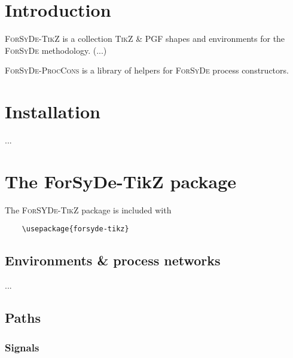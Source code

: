 \documentclass[10pt]{article}
\begin{document}
\maketitle

\begin{abstract}
This document is the reference manual for the \textsc{ForSyDe-TikZ} and \textsc{ForSyDe-ProcCons} packages. A new feature in the library should be reflected and documented in this manual.
\end{abstract}

\section{Introduction}

\textsc{ForSyDe-TikZ} is a collection \textsc{TikZ} \& \textsc{PGF} shapes and environments for the \textsc{ForSyDe} methodology. (...)

\textsc{ForSyDe-ProcCons} is a library of helpers for \textsc{ForSyDe} process constructors.

\section{Installation}

...


\section{The ForSyDe-TikZ package}

The \textsc{ForSYDe-TikZ} package is included with

\begin{verbatim}
	\usepackage{forsyde-tikz}
\end{verbatim}

\subsection{Environments \& process networks}

...

\subsection{Paths}

\subsubsection{Signals}
\end{document}
